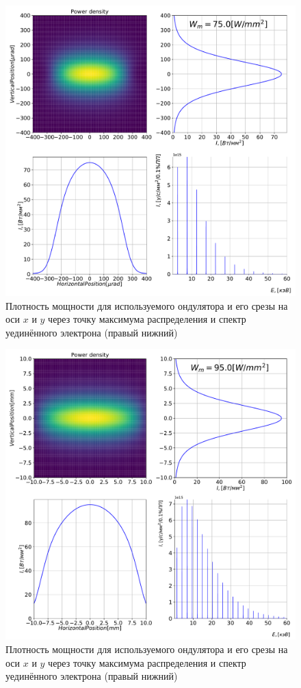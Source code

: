 \begin{figure}[h!]
	\centering  
	\includegraphics[width=\textwidth]{pic/power_dens_1-2.pdf}
	\caption{Плотность мощности для используемого ондулятора и его срезы на оси $x$ и $y$ через точку максимума распределения и спектр уединённого электрона (правый нижний)}
	\label{fig:power_dens_1-2}   
\end{figure}
\begin{figure}[h!]
	\centering  
	\includegraphics[width=\textwidth]{pic/power_dens_1-4.pdf}
	\caption{Плотность мощности для используемого ондулятора и его срезы на оси $x$ и $y$ через точку максимума распределения и спектр уединённого электрона (правый нижний)}
	\label{fig:power_dens_1-4}   
\end{figure}
